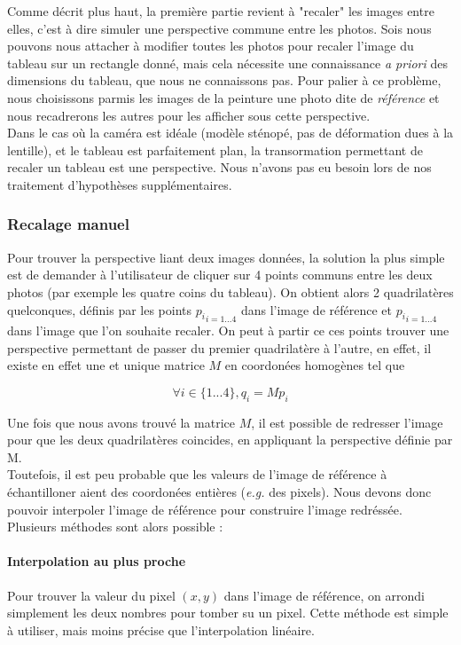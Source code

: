 \documentclass[12pt,a4paper]{article}
\begin{document}
Comme décrit plus haut, la première partie revient à "recaler" les images entre elles, c'est à dire simuler une perspective commune entre les photos. Sois nous pouvons nous attacher à modifier toutes les photos pour recaler l'image du tableau sur un rectangle donné, mais cela nécessite une connaissance \emph{a priori} des dimensions du tableau, que nous ne connaissons pas. Pour palier à ce problème, nous choisissons parmis les images de la peinture une photo dite de \emph{référence} et nous recadrerons les autres pour les afficher sous cette perspective.\\

Dans le cas où la caméra est idéale (modèle sténopé, pas de déformation dues à la lentille), et le tableau est parfaitement plan, la transormation permettant de recaler un tableau est une perspective. Nous n'avons pas eu besoin lors de nos traitement d'hypothèses supplémentaires.

\subsubsection{Recalage manuel}
Pour trouver la perspective liant deux images données, la solution la plus simple est de demander à l'utilisateur de cliquer sur 4 points communs entre les deux photos (par exemple les quatre coins du tableau). On obtient alors 2 quadrilatères quelconques, définis par les points ${p_i}_{i = 1...4}$ dans l'image de référence et ${p_i}_{i = 1...4}$ dans l'image que  l'on souhaite recaler.
On peut à partir ce ces points trouver une perspective permettant de passer du premier quadrilatère à l'autre, en effet, il existe en effet une et unique matrice $M$ en coordonées homogènes tel que

$$ \forall i \in \{1...4\}, q_i = M p_i $$

Une fois que nous avons trouvé la matrice $M$, il est possible de redresser l'image pour que les deux quadrilatères coincides, en appliquant la perspective définie par M. \\
Toutefois, il est peu probable que les valeurs de l'image de référence à échantilloner aient des coordonées entières (\emph{e.g.} des pixels). Nous devons donc pouvoir interpoler l'image de référence pour construire l'image redréssée. Plusieurs méthodes sont alors possible :
\paragraph{Interpolation au plus proche}
Pour trouver la valeur du pixel $(x,y)$ dans l'image de référence, on arrondi simplement les deux nombres pour tomber su un pixel. Cette méthode est simple à utiliser, mais moins précise que l'interpolation linéaire.
\end{document}
